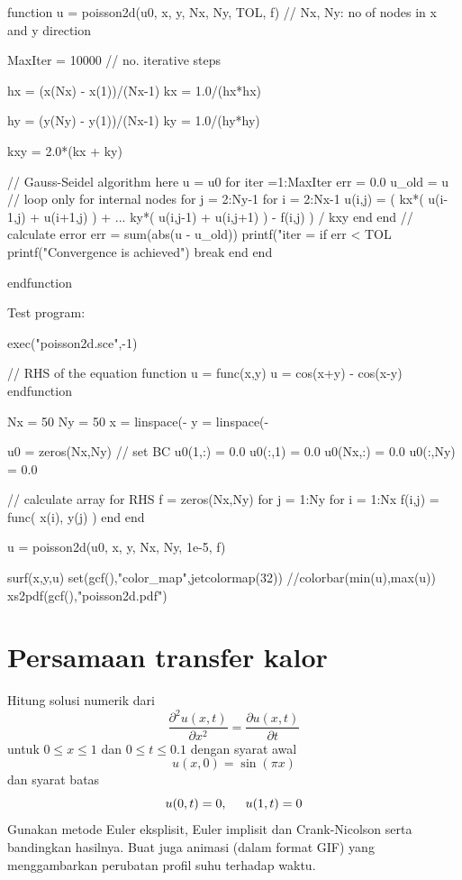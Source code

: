 \documentclass[10pt,bahasa]{article}
\begin{document}
\begin{scilabcode}
function u = poisson2d(u0, x, y, Nx, Ny, TOL, f)
// Nx, Ny: no of nodes in x and y direction

  MaxIter = 10000 // no. iterative steps

  hx = (x(Nx) - x(1))/(Nx-1)
  kx = 1.0/(hx*hx)

  hy = (y(Ny) - y(1))/(Nx-1)
  ky = 1.0/(hy*hy)

  kxy = 2.0*(kx + ky)

  // Gauss-Seidel algorithm here
  u = u0
  for iter =1:MaxIter
    err = 0.0
    u_old = u
    // loop only for internal nodes
    for j = 2:Ny-1
      for i = 2:Nx-1
        u(i,j) = ( kx*( u(i-1,j) + u(i+1,j) ) + ...
                   ky*( u(i,j-1) + u(i,j+1) ) - f(i,j) ) / kxy
      end
    end
    // calculate error
    err = sum(abs(u - u_old))
    printf("iter = %
    if err < TOL
      printf("Convergence is achieved\n")
      break
    end
  end

endfunction
\end{scilabcode}

Test program:

\begin{scilabcode}
exec("poisson2d.sce",-1)

// RHS of the equation
function u = func(x,y)
  u = cos(x+y) - cos(x-y)
endfunction
  
Nx = 50
Ny = 50
x = linspace(-%
y = linspace(-%
  
u0 = zeros(Nx,Ny)
// set BC
u0(1,:) = 0.0
u0(:,1) = 0.0
u0(Nx,:) = 0.0
u0(:,Ny) = 0.0

// calculate array for RHS
f = zeros(Nx,Ny)
for j = 1:Ny
  for i = 1:Nx
    f(i,j) = func( x(i), y(j) )
  end
end
  
u = poisson2d(u0, x, y, Nx, Ny, 1e-5, f)
  
surf(x,y,u)
set(gcf(),"color_map",jetcolormap(32))
//colorbar(min(u),max(u))
xs2pdf(gcf(),"poisson2d.pdf")
\end{scilabcode}


\section{Persamaan transfer kalor}

Hitung solusi numerik dari
\begin{equation}
\frac{\partial^2 u(x,t)}{\partial x^2} = \frac{\partial u(x,t)}{\partial t}
\end{equation}
untuk $0 \leq x \leq 1$ dan $0 \leq t \leq 0.1$ dengan syarat awal
\begin{equation}
u(x,0) = \sin(\pi x)
\end{equation}
dan syarat batas
\begin{equation}
u(0,t) = 0,\hspace{0.5cm} u(1,t) = 0
\end{equation}
Gunakan metode Euler eksplisit, Euler implisit dan Crank-Nicolson serta
bandingkan hasilnya.
Buat juga animasi (dalam format GIF) yang menggambarkan perubatan profil
suhu terhadap waktu.
\end{document}
